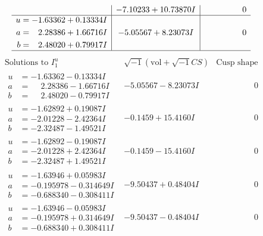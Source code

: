 \documentclass[1p]{elsarticle_modified}
\theoremstyle{definition}
\newcommand{\I}{\sqrt{-1}}
\begin{document}
$$\begin{array}{c|c|c}
 & -7.10233 + 10.73870 I & \phantom{-0.000000 } 0 \\ \hline\begin{aligned}
u &= -1.63362 + 0.13334 I \\
a &= \phantom{-}2.28386 + 1.66716 I \\
b &= \phantom{-}2.48020 + 0.79917 I\end{aligned}
 & -5.05567 + 8.23073 I & \phantom{-0.000000 } 0\\
 \hline 
 \end{array}$$\newpage$$\begin{array}{c|c|c}  
\text{Solutions to }I^u_{1}& \I (\text{vol} + \sqrt{-1}CS) & \text{Cusp shape}\\
 \hline 
\begin{aligned}
u &= -1.63362 - 0.13334 I \\
a &= \phantom{-}2.28386 - 1.66716 I \\
b &= \phantom{-}2.48020 - 0.79917 I\end{aligned}
 & -5.05567 - 8.23073 I & \phantom{-0.000000 } 0 \\ \hline\begin{aligned}
u &= -1.62892 + 0.19087 I \\
a &= -2.01228 - 2.42364 I \\
b &= -2.32487 - 1.49521 I\end{aligned}
 & -0.1459 + 15.4160 I & \phantom{-0.000000 } 0 \\ \hline\begin{aligned}
u &= -1.62892 - 0.19087 I \\
a &= -2.01228 + 2.42364 I \\
b &= -2.32487 + 1.49521 I\end{aligned}
 & -0.1459 - 15.4160 I & \phantom{-0.000000 } 0 \\ \hline\begin{aligned}
u &= -1.63946 + 0.05983 I \\
a &= -0.195978 - 0.314649 I \\
b &= -0.688340 - 0.308411 I\end{aligned}
 & -9.50437 + 0.48404 I & \phantom{-0.000000 } 0 \\ \hline\begin{aligned}
u &= -1.63946 - 0.05983 I \\
a &= -0.195978 + 0.314649 I \\
b &= -0.688340 + 0.308411 I\end{aligned}
 & -9.50437 - 0.48404 I & \phantom{-0.000000 } 0 \\ \hline\begin{aligned}

\end{aligned}
\end{array}$$
\end{document}
